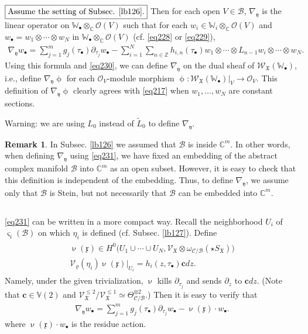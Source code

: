\documentclass[12pt,a4paper,notitlepage]{article}
\theoremstyle{definition}
\newtheorem{rem}[df]{Remark}
\theoremstyle{plain}
\newcommand{\fk}{\mathfrak}
\newcommand{\mc}{\mathcal}
\newcommand{\wtd}{\widetilde}
\newcommand{\scr}{\mathscr}
\newcommand{\xk}{\mathfrak x}
\newcommand{\yk}{\mathfrak y}
\newcommand{\sgm}{\varsigma}
\newcommand{\SX}{{S_{\fk X}}}
\newcommand{\blt}{\bullet}
\newcommand{\Vbb}{\mathbb V}
\newcommand{\Wbb}{\mathbb W}
\newcommand{\Cbb}{\mathbb C}
\newcommand{\Zbb}{\mathbb Z}
\newcommand{\cbf}{\mathbf c}
\numberwithin{equation}{section}
\begin{document}
\emph{$\boxed{\text{Assume the setting of Subsec. \ref{lb126}.}}$} Then for each open $V\in\mc B$, $\nabla_\yk$ is the linear operator on $\Wbb_\blt\otimes_\Cbb\scr O(V)$ such that for each $w_i\in\Wbb_i\otimes_\Cbb\scr O(V)$ and $w_\blt=w_1\otimes\cdots\otimes w_N$ in $\Wbb_\blt\otimes_\Cbb\scr O(V)$ (cf. \eqref{eq228} or \eqref{eq229}),
\begin{align}
\nabla_\yk w_\blt=\sum_{j=1}^m  g_j(\tau_\blt)\partial_{\tau_j} w_\blt-\sum_{i=1}^N\sum_{n\in\Zbb}h_{i,n}(\tau_\blt)w_1\otimes\cdots\otimes L_{n-1}w_i\otimes\cdots\otimes w_N.\label{eq231}
\end{align}
Using this formula and \eqref{eq230}, we can define $\nabla_\yk$ on the dual sheaf of $\scr W_{\fk X}(\Wbb_\blt)$, i.e., define $\nabla_\yk\upphi$ for each $\scr O_V$-module morphism $\upphi:\scr W_{\fk X}(\Wbb_\blt)|_V\rightarrow\scr O_V$. This definition of $\nabla_\yk\upphi$ clearly agrees with \eqref{eq217} when $w_1,\dots,w_N$ are constant sections.

Warning: we are using $L_0$ instead of $\wtd L_0$ to define $\nabla_\yk$.

\begin{rem}
In Subsec. \ref{lb126} we assumed that $\mc B$ is inside $\Cbb^m$. In other words, when defining $\nabla_\yk$ using \eqref{eq231}, we have fixed an embedding of the abstract complex manifold $\mc B$ into $\Cbb^m$ as an open subset. However, it is easy to check that this definition is independent of the embedding. Thus, to define $\nabla_\yk$, we assume only that $\mc B$ is Stein, but not necessarily that $\mc B$ can be embedded into $\Cbb^m$.
\end{rem}


\subsection{}

\eqref{eq231} can be written in a more compact way. Recall the neighborhood $U_i$  of $\sgm_i(\mc B)$ on which $\eta_i$ is defined (cf. Subsec. \ref{lb127}). Define
\begin{gather}
\begin{gathered}
\upnu(\xk)\in H^0\big(U_1\cup\cdots\cup U_N,\scr V_{\fk X}\otimes\omega_{\mc C/\mc B}(\star\SX)\big)\\
\mc V_\varrho(\eta_i)\upnu(\xk)|_{U_i}=h_i(z,\tau_\blt)\cbf dz.
\end{gathered}
\end{gather}
Namely, under the given trivialization, $\upnu$ kills $\partial_{\tau_j}$ and sends $\partial_z$ to $\cbf dz$. (Note that $\cbf\in\Vbb(2)$ and $\scr V^{\leq 2}_{\fk X}/\scr V^{\leq 1}_{\fk X}\simeq\Theta_{\mc C/\mc B}^{\otimes 2}$.) Then it is easy to verify that
\begin{align}
\nabla_\yk w_\blt=\sum_{j=1}^m  g_j(\tau_\blt)\partial_{\tau_j} w_\blt-\upnu(\xk)\cdot w_\blt.\label{eq232}
\end{align}
where $\upnu(\xk)\cdot w_\blt$ is the residue action.
\end{document}

